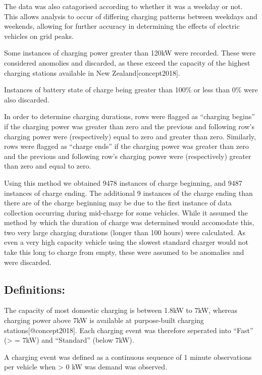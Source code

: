 \documentclass[]{article}
\begin{document}
The data was also catagorised according to whether it was a weekday or
not. This allows analysis to occur of differing charging patterns
between weekdays and weekends, allowing for further accuracy in
determining the effects of electric vehicles on grid peaks.

Some instances of charging power greater than 120kW were recorded. These
were considered anomolies and discarded, as these exceed the capacity of
the highest charging stations available in New Zealand{[}concept2018{]}.

Instances of battery state of charge being greater than 100\% or less
than 0\% were also discarded.

In order to determine charging durations, rows were flagged as
``charging begins'' if the charging power was greater than zero and the
previous and following row's charging power were (respectively) equal to
zero and greater than zero. Similarly, rows were flagged as ``charge
ends'' if the charging power was greater than zero and the previous and
following row's charging power were (respectively) greater than zero and
equal to zero.

Using this method we obtained 9478 instances of charge beginning, and
9487 instances of charge ending. The additional 9 instances of the
charge ending than there are of the charge beginning may be due to the
first instance of data collection occurring during mid-charge for some
vehicles. While it assumed the method by which the duration of charge
was determined would accomodate this, two very large charging durations
(longer than 100 hours) were calculated. As even a very high capacity
vehicle using the slowest standard charger would not take this long to
charge from empty, these were assumed to be anomalies and were
discarded.

\subsection{Definitions:}\label{definitions}

The capacity of most domestic charging is between 1.8kW to 7kW, whereas
charging power above 7kW is available at purpose-built charging
stations{[}@concept2018{]}. Each charging event was therefore seperated
into ``Fast'' (\textgreater{} = 7kW) and ``Standard'' (below 7kW).

A charging event was defined as a continuous sequence of 1 minute
observations per vehicle when \textgreater{} 0 kW was demand was
observed.
\end{document}
